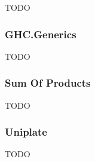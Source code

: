 

TODO

\subsubsection{GHC.Generics}

TODO %

\subsubsection{Sum Of Products}

TODO %

\subsubsection{Uniplate}


TODO %

